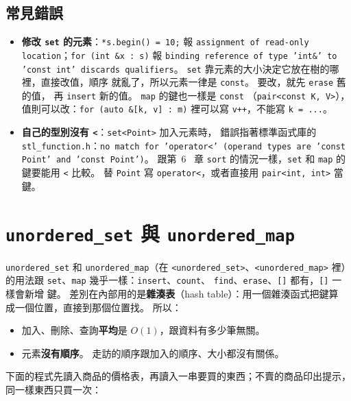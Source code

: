 \subsection{常見錯誤}

\begin{itemize}
\item \textbf{修改 \texttt{set} 的元素}：\texttt{*s.begin() = 10;} 報
\texttt{assignment of read-only location}；\texttt{for (int \&x : s)} 報
\texttt{binding reference of type 'int\&' to 'const int' discards
qualifiers}。 \texttt{set} 靠元素的大小決定它放在樹的哪裡，直接改值，順序
就亂了，所以元素一律是 \texttt{const}。 要改，就先 \texttt{erase} 舊的值，
再 \texttt{insert} 新的值。 \texttt{map} 的鍵也一樣是 \texttt{const}
（\texttt{pair<const K, V>}），值則可以改：\texttt{for (auto \&[k, v] : m)}
裡可以寫 \texttt{v++}，不能寫 \texttt{k = ...}。
\item \textbf{自己的型別沒有 \texttt{<}}：\texttt{set<Point>} 加入元素時，
錯誤指著標準函式庫的 \texttt{stl\_function.h}：\texttt{no match for
'operator<' (operand types are 'const Point' and 'const Point')}。 跟第~6~
章 \texttt{sort} 的情況一樣，\texttt{set} 和 \texttt{map} 的鍵要能用
\texttt{<} 比較。 替 \texttt{Point} 寫 \texttt{operator<}，或者直接用
\texttt{pair<int, int>} 當鍵。
\end{itemize}

\section{\texttt{unordered\_set} 與 \texttt{unordered\_map}}
\label{sec:unordered}

\texttt{unordered\_set} 和 \texttt{unordered\_map}（在
\texttt{<unordered\_set>}、\texttt{<unordered\_map>} 裡）的用法跟
\texttt{set}、\texttt{map} 幾乎一樣：\texttt{insert}、\texttt{count}、
\texttt{find}、\texttt{erase}、\texttt{[]} 都有，\texttt{[]} 一樣會新增
鍵。 差別在內部用的是\textbf{雜湊表}（hash table）：用一個雜湊函式把鍵算
成一個位置，直接到那個位置找。 所以：

\begin{itemize}
\item 加入、刪除、查詢\textbf{平均}是 $O(1)$，跟資料有多少筆無關。
\item 元素\textbf{沒有順序}。 走訪的順序跟加入的順序、大小都沒有關係。
\end{itemize}

下面的程式先讀入商品的價格表，再讀入一串要買的東西；不賣的商品印出提示，
同一樣東西只買一次：

